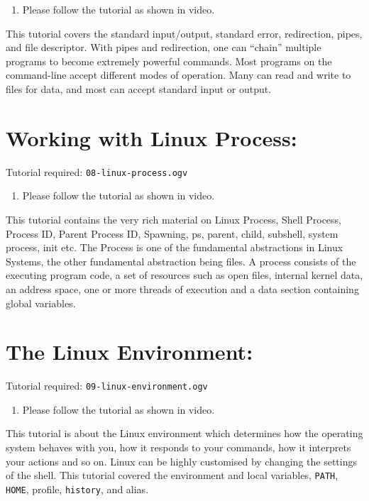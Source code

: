 \documentclass[11pt]{article}
\newenvironment{enumcpt}{\begin{enumerate} \topsep 0pt \partopsep 0pt 
                        \parsep 0pt
                        \itemsep 0pt \leftmargin -1in \rightmargin 0pt
                        }{\end{enumerate}}
\begin{document}
\begin{multicols}{2}
\begin{enumcpt}
\item Please follow the tutorial as shown in video.
\end{enumcpt}

This tutorial covers the standard input/output, standard error,
redirection, pipes, and file descriptor. With pipes and redirection,
one can ``chain'' multiple programs to become extremely powerful
commands. Most programs on the command-line accept different modes of
operation. Many can read and write to files for data, and most can
accept standard input or output.

\section{Working with Linux Process:}
Tutorial required: {\tt 08-linux-process.ogv} 

\begin{enumcpt}
\item Please follow the tutorial as shown in video.
\end{enumcpt}

This tutorial contains the very rich material on Linux Process, Shell
Process, Process ID, Parent Process ID, Spawning, ps, parent, child,
subshell, system process, init etc. The Process is one of the
fundamental abstractions in Linux Systems, the other fundamental
abstraction being files. A process consists of the executing program
code, a set of resources such as open files, internal kernel data, an
address space, one or more threads of execution and a data section
containing global variables.

\section{The Linux Environment:}
Tutorial required: {\tt 09-linux-environment.ogv}

\begin{enumcpt}
\item Please follow the tutorial as shown in video.
\end{enumcpt}

This tutorial is about the Linux environment which determines how the
operating system behaves with you, how it responds to your commands,
how it interprets your actions and so on. Linux can be highly
customised by changing the settings of the shell. This tutorial
covered the environment and local variables, {\tt PATH}, {\tt HOME},
profile, {\tt history}, and alias.


\end{multicols}
\end{document}
